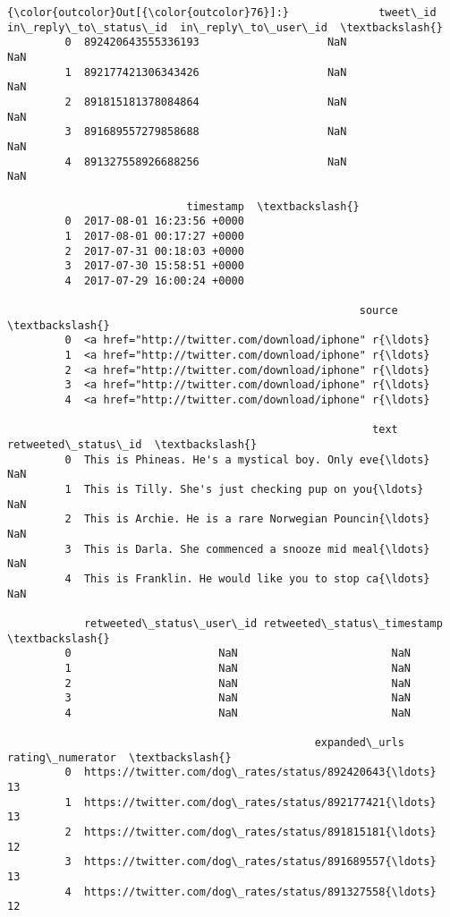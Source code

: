 \documentclass[11pt]{article}
\begin{document}
\begin{Verbatim}[commandchars=\\\{\}]
{\color{outcolor}Out[{\color{outcolor}76}]:}              tweet\_id  in\_reply\_to\_status\_id  in\_reply\_to\_user\_id  \textbackslash{}
         0  892420643555336193                    NaN                  NaN   
         1  892177421306343426                    NaN                  NaN   
         2  891815181378084864                    NaN                  NaN   
         3  891689557279858688                    NaN                  NaN   
         4  891327558926688256                    NaN                  NaN   
         
                            timestamp  \textbackslash{}
         0  2017-08-01 16:23:56 +0000   
         1  2017-08-01 00:17:27 +0000   
         2  2017-07-31 00:18:03 +0000   
         3  2017-07-30 15:58:51 +0000   
         4  2017-07-29 16:00:24 +0000   
         
                                                       source  \textbackslash{}
         0  <a href="http://twitter.com/download/iphone" r{\ldots}   
         1  <a href="http://twitter.com/download/iphone" r{\ldots}   
         2  <a href="http://twitter.com/download/iphone" r{\ldots}   
         3  <a href="http://twitter.com/download/iphone" r{\ldots}   
         4  <a href="http://twitter.com/download/iphone" r{\ldots}   
         
                                                         text  retweeted\_status\_id  \textbackslash{}
         0  This is Phineas. He's a mystical boy. Only eve{\ldots}                  NaN   
         1  This is Tilly. She's just checking pup on you{\ldots}                  NaN   
         2  This is Archie. He is a rare Norwegian Pouncin{\ldots}                  NaN   
         3  This is Darla. She commenced a snooze mid meal{\ldots}                  NaN   
         4  This is Franklin. He would like you to stop ca{\ldots}                  NaN   
         
            retweeted\_status\_user\_id retweeted\_status\_timestamp  \textbackslash{}
         0                       NaN                        NaN   
         1                       NaN                        NaN   
         2                       NaN                        NaN   
         3                       NaN                        NaN   
         4                       NaN                        NaN   
         
                                                expanded\_urls  rating\_numerator  \textbackslash{}
         0  https://twitter.com/dog\_rates/status/892420643{\ldots}                13   
         1  https://twitter.com/dog\_rates/status/892177421{\ldots}                13   
         2  https://twitter.com/dog\_rates/status/891815181{\ldots}                12   
         3  https://twitter.com/dog\_rates/status/891689557{\ldots}                13   
         4  https://twitter.com/dog\_rates/status/891327558{\ldots}                12   
         

\end{Verbatim}
\end{document}
